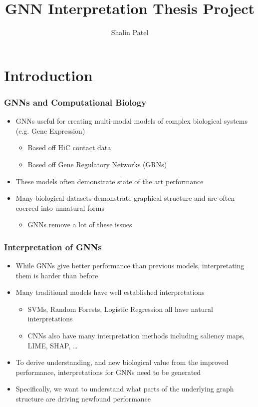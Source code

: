 \documentclass[11pt]{beamer}
\title[GNN Interpretation]{GNN Interpretation Thesis Project} %
\author[Shalin Patel]{Shalin Patel} %
\date[\today]
\begin{document}
\begin{frame}
	\titlepage
\end{frame}

\section{Introduction}

\begin{frame}
    \frametitle{GNNs and Computational Biology}

    \begin{itemize}
        \item GNNs useful for creating multi-modal models of complex biological systems (e.g. Gene Expression)
        \begin{itemize}
            \item Based off HiC contact data
            \item Based off Gene Regulatory Networks (GRNs)
        \end{itemize}
        \item These models often demonstrate state of the art performance
        \item Many biological datasets demonstrate graphical structure and are often coerced into unnatural forms
        \begin{itemize}
            \item GNNs remove a lot of these issues
        \end{itemize}
    \end{itemize}
\end{frame}

\begin{frame}
    \frametitle{Interpretation of GNNs}
   
    \begin{itemize}
        \item While GNNs give better performance than previous models, interpretating them is harder than before
        \item Many traditional models have well established interpretations
        \begin{itemize}
            \item SVMs, Random Forests, Logistic Regression all have natural interpretations
            \item CNNs also have many interpretation methods including saliency maps, LIME, SHAP, \dots
        \end{itemize} 
        \item To derive understanding, and new biological value from the improved performance, interpretations for GNNs need to be generated
        \item Specifically, we want to understand what parts of the underlying graph structure are driving newfound performance
    \end{itemize}
\end{frame}
\end{document}
